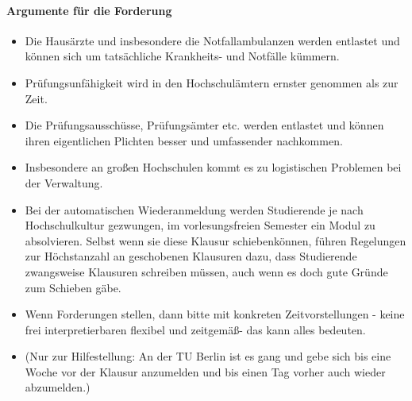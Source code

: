       \paragraph{Argumente für die Forderung}
        \begin{itemize}
          \item Die Hausärzte und insbesondere die Notfallambulanzen werden entlastet und können sich um tatsächliche Krankheits- und Notfälle kümmern.
          \item Prüfungsunfähigkeit wird in den Hochschulämtern ernster genommen als zur Zeit.
          \item Die Prüfungsausschüsse, Prüfungsämter etc. werden entlastet und können ihren eigentlichen Plichten besser und umfassender nachkommen.
          \item Insbesondere an großen Hochschulen kommt es zu logistischen Problemen bei der Verwaltung.
          \item Bei der automatischen Wiederanmeldung werden Studierende je nach Hochschulkultur gezwungen, im vorlesungsfreien Semester ein Modul zu absolvieren. Selbst wenn sie diese Klausur \flqq schieben\frqq können, führen Regelungen zur Höchstanzahl an geschobenen Klausuren dazu, dass Studierende zwangsweise Klausuren schreiben müssen, auch wenn es doch gute Gründe zum Schieben gäbe.
          \item Wenn Forderungen stellen, dann bitte mit konkreten Zeitvorstellungen - keine frei interpretierbaren \flqq flexibel und zeitgemäß\frqq - das kann alles bedeuten.
          \item (Nur zur Hilfestellung: An der TU Berlin ist es gang und gebe sich bis eine Woche vor der Klausur anzumelden und bis einen Tag vorher auch wieder abzumelden.)
        \end{itemize}

